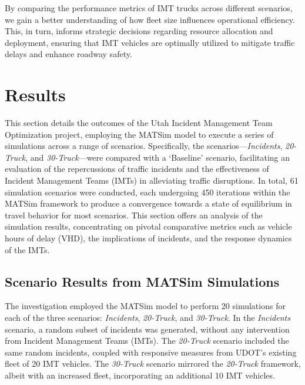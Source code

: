 \documentclass[fancy, oneside, mastersfancy, ms]{byuthesis}
\begin{document}
By comparing the performance metrics of IMT trucks across different
scenarios, we gain a better understanding of how fleet size influences
operational efficiency. This, in turn, informs strategic decisions
regarding resource allocation and deployment, ensuring that IMT vehicles
are optimally utilized to mitigate traffic delays and enhance roadway
safety.


\hypertarget{results}{%
\chapter{Results}\label{results}}

This section details the outcomes of the Utah Incident Management Team
Optimization project, employing the MATSim model to execute a series of
simulations across a range of scenarios. Specifically, the
scenarios---\emph{Incidents}, \emph{20-Truck}, and
\emph{30-Truck}---were compared with a `Baseline' scenario, facilitating
an evaluation of the repercussions of traffic incidents and the
effectiveness of Incident Management Teams (IMTs) in alleviating traffic
disruptions. In total, 61 simulation scenarios were conducted, each
undergoing 450 iterations within the MATSim framework to produce a
convergence towards a state of equilibrium in travel behavior for most
scenarios. This section offers an analysis of the simulation results,
concentrating on pivotal comparative metrics such as vehicle hours of
delay (VHD), the implications of incidents, and the response dynamics of
the IMTs.

\hypertarget{scenario-results-from-matsim-simulations}{%
\section{Scenario Results from MATSim
Simulations}\label{scenario-results-from-matsim-simulations}}

The investigation employed the MATSim model to perform 20 simulations
for each of the three scenarios: \emph{Incidents}, \emph{20-Truck}, and
\emph{30-Truck}. In the \emph{Incidents} scenario, a random subset of
incidents was generated, without any intervention from Incident
Management Teams (IMTs). The \emph{20-Truck} scenario included the same
random incidents, coupled with responsive measures from UDOT's existing
fleet of 20 IMT vehicles. The \emph{30-Truck} scenario mirrored the
\emph{20-Truck} framework, albeit with an increased fleet, incorporating
an additional 10 IMT vehicles.
\end{document}
